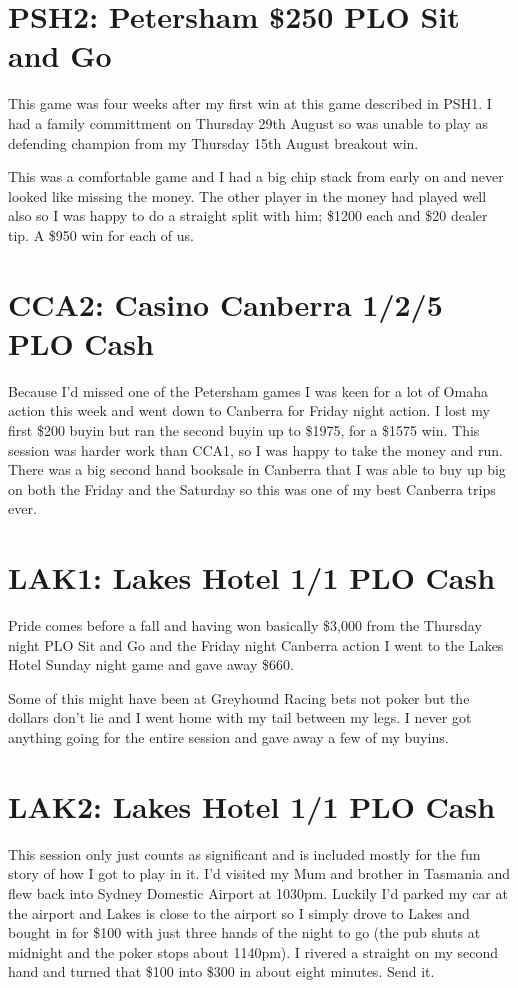 \section*{PSH2: Petersham \$250 PLO Sit and Go}

This game was four weeks after my first win at this game described in
PSH1. I had a family committment on Thursday 29th August so was unable
to play as defending champion from my Thursday 15th August breakout
win.

This was a comfortable game and I had a big chip stack from early on
and never looked like missing the money. The other player in the money
had played well also so I was happy to do a straight split with him;
\$1200 each and \$20 dealer tip. A \$950 win for each of us.

\section*{CCA2: Casino Canberra 1/2/5 PLO Cash}

Because I'd missed one of the Petersham games I was keen for a lot of
Omaha action this week and went down to Canberra for Friday night
action. I lost my first \$200 buyin but ran the second buyin up to
\$1975, for a \$1575 win. This session was harder work than CCA1, so I
was happy to take the money and run. There was a big second hand
booksale in Canberra that I was able to buy up big on both the Friday
and the Saturday so this was one of my best Canberra trips ever.

\section*{LAK1: Lakes Hotel 1/1 PLO Cash}

Pride comes before a fall and having won basically \$3,000 from the
Thursday night PLO Sit and Go and the Friday night Canberra action I
went to the Lakes Hotel Sunday night game and gave away \$660.

Some of this might have been at Greyhound Racing bets not poker but
the dollars don't lie and I went home with my tail between my legs. I
never got anything going for the entire session and gave away a few of
my buyins.

\section*{LAK2: Lakes Hotel 1/1 PLO Cash}

This session only just counts as significant and is included mostly
for the fun story of how I got to play in it. I'd visited my Mum and
brother in Tasmania and flew back into Sydney Domestic Airport at
1030pm. Luckily I'd parked my car at the airport and Lakes is close to
the airport so I simply drove to Lakes and bought in for \$100 with
just three hands of the night to go (the pub shuts at midnight and the
poker stops about 1140pm). I rivered a straight on my second hand and
turned that \$100 into \$300 in about eight minutes. Send it.

